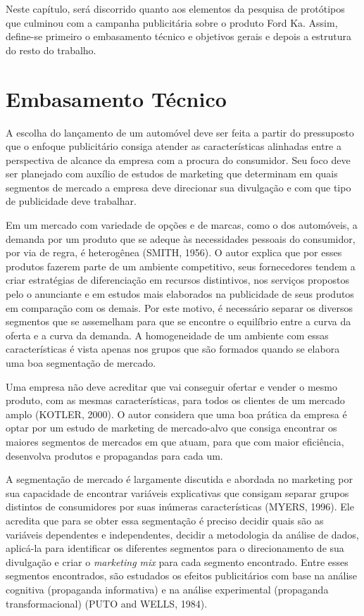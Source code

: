 Neste capítulo, será discorrido quanto aos elementos da pesquisa de
protótipos que culminou com a campanha publicitária sobre o produto
Ford Ka\texttrademark. Assim, define-se primeiro o embasamento técnico
e objetivos gerais e depois a estrutura do resto do trabalho.


\section{Embasamento Técnico}

\label{sec:embasamento-tecnico}

A escolha do lançamento de um automóvel deve ser feita a partir do
pressuposto que o enfoque publicitário consiga atender as características
alinhadas entre a perspectiva de alcance da empresa com a procura
do consumidor. Seu foco deve ser planejado com auxílio de estudos
de marketing que determinam em quais segmentos de mercado a empresa
deve direcionar sua divulgação e com que tipo de publicidade deve
trabalhar. 

Em um mercado com variedade de opções e de marcas, como o dos automóveis,
a demanda por um produto que se adeque às necessidades pessoais do
consumidor, por via de regra, é heterogênea (SMITH, 1956). O autor
explica que por esses produtos fazerem parte de um ambiente competitivo,
seus fornecedores tendem a criar estratégias de diferenciação em recursos
distintivos, nos serviços propostos pelo o anunciante e em estudos
mais elaborados na publicidade de seus produtos em comparação com
os demais. Por este motivo, é necessário separar os diversos segmentos
que se assemelham para que se encontre o equilíbrio entre a curva
da oferta e a curva da demanda. A homogeneidade de um ambiente com
essas características é vista apenas nos grupos que são formados quando
se elabora uma boa segmentação de mercado. 

Uma empresa não deve acreditar que vai conseguir ofertar e vender
o mesmo produto, com as mesmas características, para todos os clientes
de um mercado amplo (KOTLER, 2000). O autor considera que uma boa
prática da empresa é optar por um estudo de marketing de mercado-alvo
que consiga encontrar os maiores segmentos de mercados em que atuam,
para que com maior eficiência, desenvolva produtos e propagandas para
cada um. 

A segmentação de mercado é largamente discutida e abordada no marketing
por sua capacidade de encontrar variáveis explicativas que consigam
separar grupos distintos de consumidores por suas inúmeras características
(MYERS, 1996). Ele acredita que para se obter essa segmentação é
preciso decidir quais são as variáveis dependentes e independentes,
decidir a metodologia da análise de dados, aplicá-la para identificar
os diferentes segmentos para o direcionamento de sua divulgação e
criar o \emph{marketing mix} para cada segmento encontrado. Entre
esses segmentos encontrados, são estudados os efeitos publicitários
com base na análise cognitiva (propaganda informativa) e na análise
experimental (propaganda transformacional) (PUTO and WELLS, 1984). 

